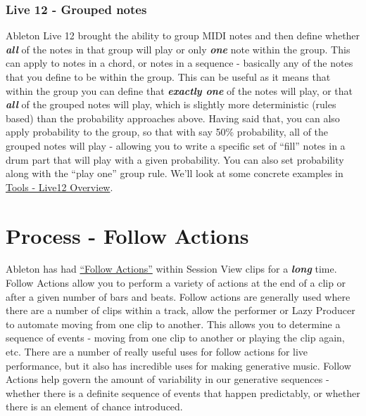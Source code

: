 \documentclass[
  12pt,
  letterpaper,
  oneside,
  open=any]{scrbook}
\begin{document}
\subsection{Live 12 - Grouped notes}\label{live-12---grouped-notes}

Ableton Live 12 brought the ability to group MIDI notes and then define
whether \textbf{\emph{all}} of the notes in that group will play or only
\textbf{\emph{one}} note within the group. This can apply to notes in a
chord, or notes in a sequence - basically any of the notes that you
define to be within the group. This can be useful as it means that
within the group you can define that \textbf{\emph{exactly one}} of the
notes will play, or that \textbf{\emph{all}} of the grouped notes will
play, which is slightly more deterministic (rules based) than the
probability approaches above. Having said that, you can also apply
probability to the group, so that with say 50\% probability, all of the
grouped notes will play - allowing you to write a specific set of
``fill'' notes in a drum part that will play with a given probability.
You can also set probability along with the ``play one'' group rule.
We'll look at some concrete examples in
\hyperref[Chapter-030-Tools-Live12_Intro]{Tools - Live12 Overview}.


\chapter{Process - Follow
Actions}\label{Chapter-003-Process-Follow_Actions}

Ableton has had
\href{https://www.ableton.com/en/live-manual/11/launching-clips/\#follow-actions}{``Follow
Actions''} within Session View clips for a \textbf{\emph{long}} time.
Follow Actions allow you to perform a variety of actions at the end of a
clip or after a given number of bars and beats. Follow actions are
generally used where there are a number of clips within a track, allow
the performer or Lazy Producer to automate moving from one clip to
another. This allows you to determine a sequence of events - moving from
one clip to another or playing the clip again, etc. There are a number
of really useful uses for follow actions for live performance, but it
also has incredible uses for making generative music. Follow Actions
help govern the amount of variability in our generative sequences -
whether there is a definite sequence of events that happen predictably,
or whether there is an element of chance introduced.
\end{document}
